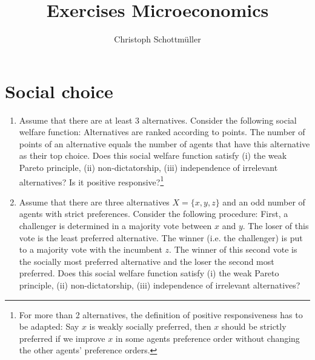 \documentclass[a4paper,12pt]{article}
\title{Exercises Microeconomics}
\author{Christoph Schottm\"uller}
\date{}
\begin{document}
\maketitle
\section{Social choice}
\label{sec:social-choice}

\begin{enumerate}
\item Assume that there are at least 3 alternatives. Consider the following social welfare function: Alternatives are ranked according to points. The number of points of an alternative equals the number of agents that have this alternative as their top choice. Does this social welfare function satisfy (i) the weak Pareto principle, (ii) non-dictatorship, (iii) independence of irrelevant alternatives? Is it positive responsive?\footnote{For more than 2 alternatives, the definition of positive responsiveness has to be adapted: Say $x$ is weakly socially preferred, then $x$ should be strictly preferred if we improve $x$ in some agents preference order without changing the other agents' preference orders.}
\item Assume that there are three alternatives $X=\{x,y,z\}$ and an odd number of agents with strict preferences. Consider the following procedure: First, a challenger is determined in a majority vote between $x$ and $y$. The loser of this vote is the least preferred alternative. The winner (i.e. the challenger) is put to a majority vote with the incumbent $z$. The winner of this second vote is the socially most preferred alternative and the loser the second most preferred. Does this social welfare function satisfy (i) the weak Pareto principle, (ii) non-dictatorship, (iii) independence of irrelevant alternatives?

\end{enumerate}
\end{document}
